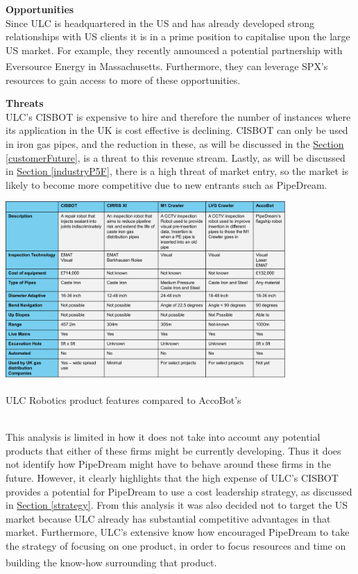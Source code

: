 \documentclass[11pt]{article}		%
\newcommand{\supercite}[1]{\textsuperscript{\cite{#1}}}		%
\newcommand{\sectref}[1]{\hyperref[#1]{Section \ref*{#1}}}     %
\begin{document}
	        \textbf{Opportunities}
	        \\
	        Since ULC is headquartered in the US and has already developed strong relationships with US clients it is in a prime position to capitalise upon the large US market. For example, they recently announced a potential partnership with Eversource Energy in Massachusetts\supercite{ULC_news}. Furthermore, they can leverage SPX's resources to gain access to more of these opportunities.
	        
	        \textbf{Threats}
	        \\
	        ULC's CISBOT is expensive to hire and therefore the number of instances where its application in the UK is cost effective is declining. CISBOT can only be used in iron gas pipes, and the reduction in these, as will be discussed in the \sectref{customerFuture}, is a threat to this revenue stream. Lastly, as will be discussed in \sectref{industryP5F}, there is a high threat of market entry, so the market is likely to become more competitive due to new entrants such as PipeDream.
            \begin{table}[h]
				\centering
				\includegraphics[width=0.8\textwidth]{updated competitor analysis table.png}
				\caption{ULC Robotics product features compared to AccoBot's\supercite{ULC_Robots}}
				\label{ULCFeatures}
			\end{table}
			\\
            \hspace*{2ex}This analysis is limited in how it does not take into account any potential products that either of these firms might be currently developing. Thus it does not identify how PipeDream might have to behave around these firms in the future. However, it clearly highlights that the high expense of ULC's CISBOT provides a potential for PipeDream to use a cost leadership strategy, as discussed in \sectref{strategy}. From this analysis it was also decided not to target the US market because ULC already has substantial competitive advantages in that market. Furthermore, ULC's extensive know how encouraged PipeDream to take the strategy of focusing on one product, in order to focus resources and time on building the know-how surrounding that product\supercite{Barney}.  %
\end{document}
